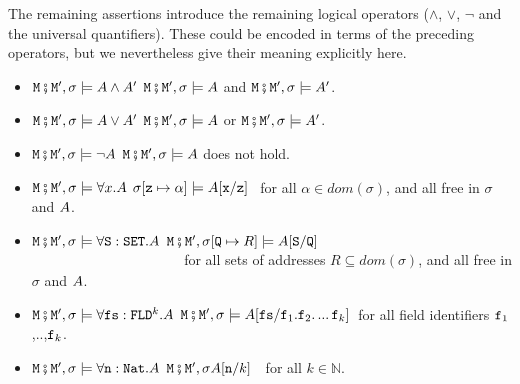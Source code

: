 \begin{definition}
The remaining assertions introduce the remaining logical operators (\ie $\wedge$, $\vee$, $\neg$ and the universal quantifiers). These could be encoded in terms of the preceding operators, but we nevertheless give their meaning explicitly here.

\begin{itemize}
\item
$\M\mkpair \M', \sigma \models  \A \wedge \A'$   \IFF  $\M\mkpair \M', \sigma \models  \A $
and $\M\mkpair \M', \sigma \models  \A'$.
\item
$\M\mkpair \M', \sigma \models  \A \vee \A'$   \IFF  $\M\mkpair \M', \sigma \models  \A $
or $\M\mkpair \M', \sigma \models  \A'$.
\item
$\M\mkpair \M', \sigma \models  \neg\A$   \IFF  $\M\mkpair \M', \sigma \models  \A $
does not hold.
\item
$\M\mkpair \M', \sigma \models \forall x.\A$ \IFF  
$\sigma[\prg{z}\mapsto \alpha] \models  \A[\prg{x}/\prg{z}]$ \ for all  $\alpha\in dom(\sigma)$, and   all  free in $\sigma$ and $\A$.\item
$\M\mkpair \M', \sigma \models \forall \prg{S}:\prg{SET}.\A$ \IFF  $\M\mkpair \M', \sigma[\prg{Q}\mapsto R] \models  \A[\prg{S}/\prg{Q}]$ \\
$\strut ~ \hspace{1.4in} $ for all sets of addresses $R\subseteq dom(\sigma)$, and  all  free in $\sigma$ and $\A$.
 
\item
$\M\mkpair \M', \sigma \models \forall \prg{fs}:\prg{FLD}^k.\A$ \IFF  
$\M\mkpair \M', \sigma \models  \A[\prg{fs}/\prg{f}_1.\f_2.\,...\,\prg{f}_k]$\  for  all  field identifiers $\prg{f}_1$,..,$\prg{f}_k$.
\item
$\M\mkpair \M', \sigma \models  \forall \prg{n}:\prg{Nat}.\A$ \IFF  $\M\mkpair \M', \sigma \A[\prg{n}/k]$\ \ for all $k\in\mathbb{N}$.
\end{itemize}\end{definition} 



